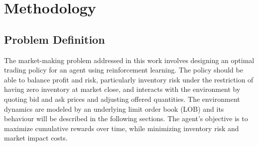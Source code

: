 \section{Methodology}
\label{sec:methodology}

\subsection{Problem Definition}
\label{subsec:problem-definition}

The market-making problem addressed in this work involves designing an optimal trading policy for an agent using reinforcement learning.
The policy should be able to balance profit and risk, particularly inventory risk under the restriction of having zero inventory at market close,
and interacts with the environment by quoting bid and ask prices and adjusting offered quantities.
The environment dynamics are modeled by an underlying limit order book (LOB) and its behaviour will be described in the following sections.
The agent's objective is to maximize cumulative rewards over time, while minimizing inventory risk and market impact costs.






